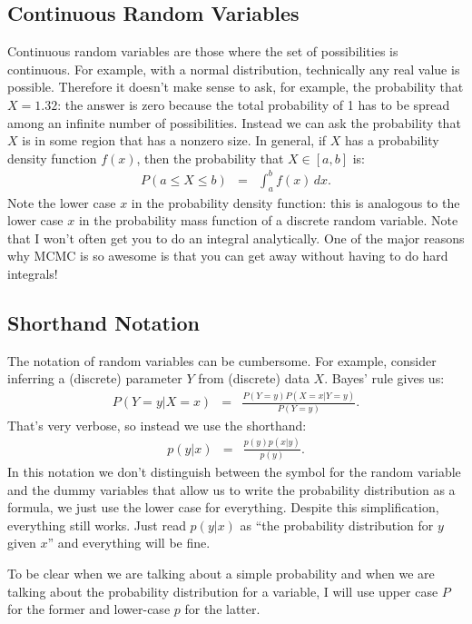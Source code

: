 \subsection{Continuous Random Variables}
Continuous random variables are those where the set of possibilities is
continuous. For example, with a normal distribution, technically any real value
is possible. Therefore it doesn't make sense to ask, for example, the probability
that $X=1.32$: the answer is zero because the total probability of 1 has to be
spread among an infinite number of possibilities. Instead we can ask the probability
that $X$ is in some region that has a nonzero size. In general, if $X$ has a
probability density function $f(x)$, then the probability that $X \in [a, b]$ is:
\begin{eqnarray}
P(a \leq X \leq b) &=& \int_a^b f(x) \, dx.
\end{eqnarray}
Note the lower case $x$ in the probability density function: this is analogous
to the lower case $x$ in the probability mass function of a discrete random
variable. Note that I won't often get you to do an integral analytically. One
of the major reasons why MCMC is so awesome is that you can get away without
having to do hard integrals!

\subsection{Shorthand Notation}
The notation of random variables can be cumbersome. For example, consider
inferring a (discrete) parameter $Y$ from (discrete) data $X$. Bayes' rule gives us:
\begin{eqnarray}
P(Y=y | X=x) &=& \frac{P(Y=y)P(X=x|Y=y)}{P(Y=y)}.
\end{eqnarray}
That's very verbose, so instead we use the shorthand:
\begin{eqnarray}
p(y | x) &=& \frac{p(y)p(x|y)}{p(y)}.
\end{eqnarray}
In this notation we don't distinguish between the symbol for the random variable
and the dummy variables that allow us to write the probability distribution as
a formula, we just use the lower case for everything. Despite this simplification,
everything still works. Just read
$p(y|x)$ as ``the probability distribution for $y$ given $x$'' and everything
will be fine.

To be clear when we are talking about a simple probability and when we are
talking about the probability distribution for a variable, I will use upper case
$P$ for the former and lower-case $p$ for the latter.


